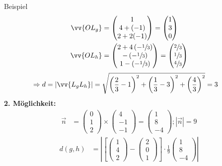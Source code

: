 \documentclass{article}
\begin{document}
\begin{boxx}[DarkBlue]{Beispiel}
\begin{align*}
        \vv{OL_g} &= \begin{pmatrix}1\\4+(-1)\\2+2(-1)\end{pmatrix} = \begin{pmatrix}1\\3\\0\end{pmatrix}\\
        \vv{OL_h} &= \begin{pmatrix}2+4\left(-\sfrac{1}{3}\right)\\-\left(-\sfrac{1}{3}\right)\\1-\left(-\sfrac{1}{3}\right)\end{pmatrix} = \begin{pmatrix}\sfrac{2}{3}\\\sfrac{1}{3}\\\sfrac{4}{3}\end{pmatrix}
    \end{align*}
    \begin{align*}
        \Rightarrow d &= |\vv{L_gL_h}| = \sqrt{\left(\frac{2}{3}-1\right)^2+ \left(\frac{1}{3}-3\right)^2 + \left(\frac{4}{3}\right)^2} = 3
    \end{align*}
    \textbf{2. Möglichkeit:}
    \begin{align*}
        \vec{n} &= \begin{pmatrix}0\\1\\2\end{pmatrix} \times \begin{pmatrix}4\\-1\\-1\end{pmatrix} = \begin{pmatrix}1\\8\\-4\end{pmatrix}; |\vec{n}| = 9
    \end{align*}
    \begin{align*}
        d(g,h) &= \left|\left[\begin{pmatrix}1\\4\\2\end{pmatrix}- \begin{pmatrix}2\\0\\1\end{pmatrix}\right] \cdot \frac{1}{9} \begin{pmatrix}1\\8\\-4\end{pmatrix}\right| \\

\end{align*}
\end{boxx}
\end{document}

